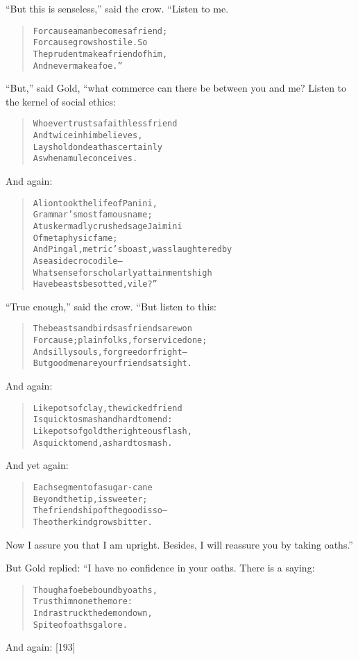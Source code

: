 \documentclass[article, twoside, 14pt]{memoir}
\renewenvironment{verbatim}{%
\begin{quote}%
\vskip -10pt%
\begin{alltt}\normalfont\large}{\end{alltt}%
\end{quote}%
\vskip -10pt
} %
\begin{document}
``But this is senseless,'' said the crow. “Listen to me.

\begin{verbatim}
For cause a man becomes a friend;
    For cause grows hostile. So
The prudent make a friend of him,
    And never make a foe.”
\end{verbatim}
``But,'' said Gold, “what commerce can there be between you and me?
Listen to the kernel of social ethics:

\begin{verbatim}
Whoever trusts a faithless friend
    And twice in him believes,
Lays hold on death as certainly
    As when a mule conceives.
\end{verbatim}
And again:

\begin{verbatim}
A lion took the life of Panini,
    Grammar's most famous name;
A tusker madly crushed sage Jaimini
    Of metaphysic fame;
And Pingal, metric's boast, was slaughtered by
    A seaside crocodile--
What sense for scholarly attainments high
    Have beasts besotted, vile?”
\end{verbatim}
``True enough,'' said the crow. “But listen to this:

\begin{verbatim}
The beasts and birds as friends are won
For cause; plain folks, for service done;
And silly souls, for greed or fright--
But good men are your friends at sight.
\end{verbatim}
And again:

\begin{verbatim}
Like pots of clay, the wicked friend
Is quick to smash and hard to mend:
Like pots of gold the righteous flash,
As quick to mend, as hard to smash.
\end{verbatim}
And yet again:

\begin{verbatim}
Each segment of a sugar-cane
    Beyond the tip, is sweeter;
The friendship of the good is so--
    The other kind grows bitter.
\end{verbatim}
Now I assure you that I am upright. Besides, I will reassure you by
taking oaths.”

But Gold replied: “I have no confidence in your oaths. There is a
saying:

\begin{verbatim}
Though a foe be bound by oaths,
    Trust him none the more:
Indra struck the demon down,
    Spite of oaths galore.
\end{verbatim}
And again: [193]
\end{document}
